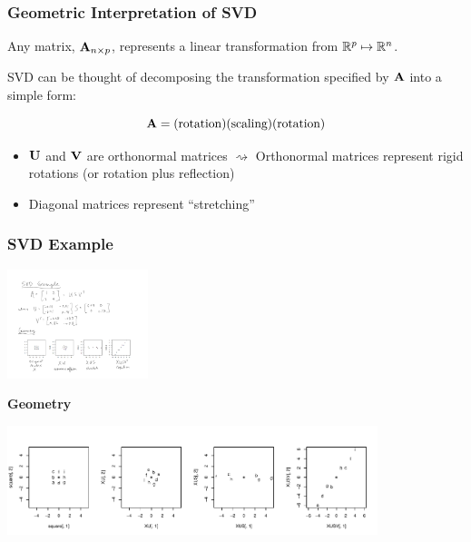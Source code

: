 \documentclass{beamer}
\begin{document}
\begin{frame}
  \frametitle{Geometric Interpretation of SVD}

Any matrix, $\mathbf{A}_{n \times p}$, represents a linear transformation from $\mathbb{R}^p \mapsto  \mathbb{R}^n$. 

\medskip
SVD can be thought of decomposing the transformation specified by $\mathbf{A}$ into a simple form:

$$ \mathbf{A} = (\text{rotation})(\text{scaling)}(\text{rotation})$$

\begin{itemize}
\item $\mathbf{U}$ and $\mathbf{V}$ are orthonormal matrices $\rightsquigarrow$ Orthonormal matrices represent rigid rotations (or rotation plus reflection)
\item Diagonal matrices represent ``stretching''
\end{itemize}


\end{frame}



\begin{frame}
  \frametitle{SVD Example}

\begin{center}
\includegraphics[height=1.25in]{svd-example-mtx}
\end{center}

\medskip
\textbf{Geometry}
\begin{center}
\includegraphics[height=1.25in]{svd-example}
\end{center}

\end{frame}
\end{document}
